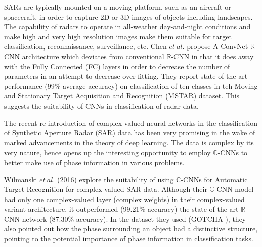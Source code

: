 SARs are typically mounted on a moving platform, such as an aircraft or spacecraft, in order to capture 2D or 3D images of objects including landscapes. The capability of radars to operate in all-weather day-and-night conditions and make high and very high resolution images make them suitable for target classification, reconnaissance,
surveillance, etc. 
Chen $et \ al.$ propose A-ConvNet $\mathbb{R}$-CNN architecture which deviates from conventional $\mathbb{R}$-CNN in that it does away with the Fully Connected (FC) layers in order to decrease the number of parameters in an attempt to decrease over-fitting. They report state-of-the-art performance (99\% average accuracy) on classification of ten classes in teh Moving and Stationary Target Acquisition and Recognition (MSTAR) dataset. This suggests the suitability of CNNs in classification of radar data. 

The recent re-introduction of complex-valued neural networks in the classification of Synthetic Aperture Radar (SAR) data has been very promising in the wake of marked advancements in the theory of deep learning. The data is complex by its very nature, hence opens up the interesting opportunity to employ $\mathbb{C}$-CNNs to better make use of phase information in various problems.

Wilmanski $et \ al.$ (2016) \cite{wilmanski2016complex} explore the suitability of using $\mathbb{C}$-CNNs for Automatic Target Recognition for complex-valued SAR data. Although their $\mathbb{C}$-CNN model had only one complex-valued layer (complex weights) in their complex-valued variant architecture, it outperformed (99.21\% accuracy) the state-of-the-art $\mathbb{R}$-CNN network (87.30\% accuracy). In the dataset they used (GOTCHA \cite{gotcha}), they also pointed out how the phase surrounding an object had a distinctive structure, pointing to the potential importance of phase information in classification tasks.

